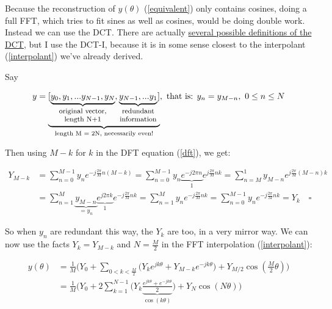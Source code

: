 \documentclass[10pt]{article}
\begin{document}
Because the reconstruction of $y(\theta)$ (\autoref{equivalent}) only contains cosines, doing a full FFT, which tries to fit sines as well as cosines, would be doing double work. Instead we can use the DCT. There are actually \href{https://docs.scipy.org/doc/scipy/reference/generated/scipy.fft.dct.html}{several possible definitions of the DCT}\cite{dct}, but I use the DCT-I, because it is in some sense closest to the interpolant (\autoref{interpolant}) we've already derived.

Say\vspace{-8mm}

$$y = \underbrace{[\underbrace{y_0, y_1, ... y_{N-1}, y_N}_{\parbox{20mm}{\footnotesize \centering original vector, length N+1}}, \underbrace{y_{N-1}, ... y_1}_{\parbox{16mm}{\footnotesize \centering redundant information}}]}_{\text{length M = 2N, necessarily even!}}, \text{ that is: } y_n = y_{M-n},\ 0 \leq n \leq N$$

Then using $M-k$ for $k$ in the DFT equation (\autoref{dft}), we get:

\begin{align*}
Y_{M-k} &= \sum_{n=0}^{M-1} y_n e^{-j \frac{2\pi}{M}n(M-k)} = \sum_{n=0}^{M-1} y_n \underbrace{e^{-j 2\pi n}}_{1} e^{j \frac{2\pi}{M}nk} = \sum_{n = M}^{1} y_{M-n} e^{j \frac{2\pi}{M}(M - n)k} \\
&= \sum_{n=1}^{M} \underbrace{y_{M-n}}_{= y_n} \underbrace{e^{j 2\pi k}}_{1} e^{-j\frac{2\pi}{M}nk} = \sum_{n=1}^M y_n e^{-j \frac{2\pi}{M}nk} = \sum_{n=0}^{M-1} y_n e^{-j \frac{2\pi}{M}nk} = Y_k \quad \square
\end{align*}
\newline

So when $y_n$ are redundant this way, the $Y_k$ are too, in a very mirror way. We can now use the facts $Y_k = Y_{M-k}$ and $N = \frac{M}{2}$ in the FFT interpolation (\autoref{interpolant}):

\begin{equation}\label{reconstruction}
\begin{aligned}
y(\theta) &= \frac{1}{M} \Big(Y_0 + \sum_{0 < k < \frac{M}{2}} \big( Y_k e^{j k \theta} + Y_{M-k} e^{-j k \theta}\big) + Y_{M/2}\cos(\frac{M}{2}\theta) \Big) \\
&= \frac{1}{M} \Big(Y_0 + 2 \sum_{k = 1}^{N-1} \big( Y_k \underbrace{\frac{e^{j k \theta} + e^{-j k \theta}}{2}}_{\cos(k\theta)} \big) + Y_N\cos(N \theta) \Big)
\end{aligned}
\end{equation}
\end{document}
